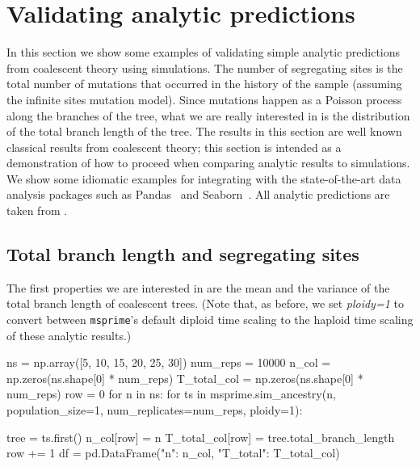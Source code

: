 \documentclass[graybox]{svmult}
\newcommand{\msprime}[0]{\texttt{msprime}}
\begin{document}

\section{Validating analytic predictions}\label{validating-analytical-predictions}

In this section we show some examples of validating simple analytic
predictions from coalescent theory using simulations. The number of
segregating sites is the total number of mutations that occurred in the
history of the sample (assuming the infinite sites mutation model).
Since mutations happen as a Poisson process along the branches of the
tree, what we are really interested in is the distribution of the total
branch length of the tree. The results in this section are well known
classical results from coalescent theory; this section is intended as a
demonstration of how to proceed when comparing analytic results to
simulations. We show some idiomatic examples for integrating with
the state-of-the-art data analysis packages such
as Pandas~\citep{mckinney2010data} and Seaborn~\citep{michael_waskom_2017_883859}.
All analytic predictions are taken from \cite{wakely2008coalescent}.

\subsection{Total branch length and segregating sites}
The first properties we are interested in are the mean and the
variance of the total branch length of coalescent trees. (Note that, as
before, we set \emph{ploidy=1} to convert between \msprime's default diploid time
scaling to the haploid time scaling of these analytic results.)

\begin{pythoncode}
ns = np.array([5, 10, 15, 20, 25, 30])
num_reps = 10000
n_col = np.zeros(ns.shape[0] * num_reps)
T_total_col = np.zeros(ns.shape[0] * num_reps)
row = 0
for n in ns:
    for ts in msprime.sim_ancestry(n, population_size=1,
            num_replicates=num_reps, ploidy=1):

        tree = ts.first()
        n_col[row] = n
        T_total_col[row] = tree.total_branch_length
        row += 1
df = pd.DataFrame({"n": n_col, "T_total": T_total_col})
\end{pythoncode}
\end{document}
